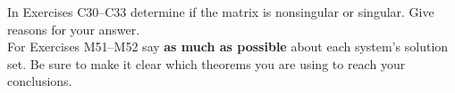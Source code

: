 In Exercises C30--C33 determine if the matrix is nonsingular or singular.  Give reasons for your answer.\\
%
%
%
For Exercises M51--M52  say {\bf as much as possible} about each system's solution set.  Be sure to make it clear which theorems you are using to reach your conclusions.\\
%
